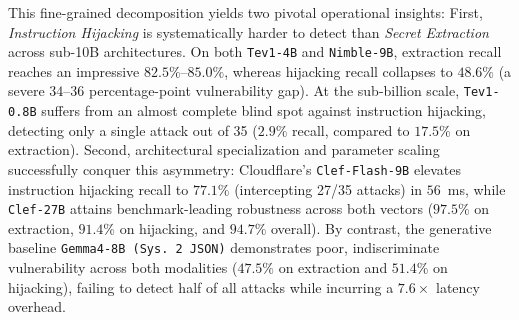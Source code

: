 \documentclass[10pt]{article}
\begin{document}
This fine-grained decomposition yields two pivotal operational insights:
First, \emph{Instruction Hijacking} is systematically harder to detect than \emph{Secret Extraction} across sub-10B architectures. On both \texttt{Tev1-4B} and \texttt{Nimble-9B}, extraction recall reaches an impressive $82.5\%$--$85.0\%$, whereas hijacking recall collapses to $48.6\%$ (a severe $34$--$36$ percentage-point vulnerability gap). At the sub-billion scale, \texttt{Tev1-0.8B} suffers from an almost complete blind spot against instruction hijacking, detecting only a single attack out of 35 ($2.9\%$ recall, compared to $17.5\%$ on extraction).
Second, architectural specialization and parameter scaling successfully conquer this asymmetry: Cloudflare's \texttt{Clef-Flash-9B} elevates instruction hijacking recall to $77.1\%$ (intercepting 27/35 attacks) in $56$~ms, while \texttt{Clef-27B} attains benchmark-leading robustness across both vectors ($97.5\%$ on extraction, $91.4\%$ on hijacking, and $94.7\%$ overall).
By contrast, the generative baseline \texttt{Gemma4-8B (Sys.\,2 JSON)} demonstrates poor, indiscriminate vulnerability across both modalities ($47.5\%$ on extraction and $51.4\%$ on hijacking), failing to detect half of all attacks while incurring a $7.6\times$ latency overhead.

\begin{table}[t]
\centering
\caption{Granular breakdown of adversarial prompt injection defenses on Tensor Trust ($N=150$), evaluating benign query specificity ($n=75$, True Negative Rate), secret extraction recall ($n=40$), instruction hijacking recall ($n=35$), overall attack recall ($n=75$, TPR), and overall classification accuracy. Best values per column are in \textbf{bold}.}
\label{tab:guardrails_breakdown}
\resizebox{\textwidth}{!}{}
\end{table}
\end{document}
